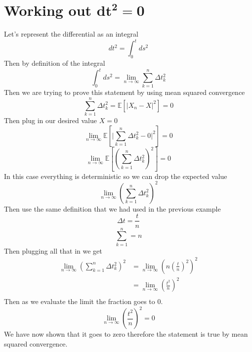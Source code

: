 \documentclass{article}
\begin{document}
\section*{Working out $\boldsymbol{dt^2 = 0}$}
Let's represent the differential as an integral
$$
dt^2 = \int_0^{t} ds^2
$$
Then by definition of the integral
$$
\int_0^t ds^2 = \lim_{n \to \infty} \sum_{k=1}^n \Delta t_k^2
$$
Then we are trying to prove this statement by using mean squared convergence
$$
\sum_{k=1}^n \Delta t_k^2 = \mathbb{E} \left[ \biggr\rvert X_n - X \biggr\rvert^2 \right] = 0
$$
Then plug in our desired value $X = 0$ 
$$
\lim_{n \to \infty} \mathbb{E} \left[ \biggr\rvert \sum_{k=1}^n \Delta t_k^2 - 0 \biggr\rvert^2 \right] = 0
$$
$$
\lim_{n \to \infty} \mathbb{E} \left[ \left(\sum_{k=1}^n \Delta t_k^2 \right)^2 \right] = 0
$$
In this case everything is deterministic so we can drop the expected value
$$
\lim_{n \to \infty} \left( \sum_{k=1}^n \Delta t_k^2 \right)^2
$$
Then use the same definition that we had used in the previous example 
$$
\Delta t = \frac{t}{n}
$$
$$
\sum_{k=1}^n = n
$$
Then plugging all that in we get 
\begin{equation}
\begin{split}
    \lim_{n \to \infty} \left(\sum_{k=1}^n \Delta t_k^2 \right)^2 &= \lim_{n \to \infty} \left( n \left( \frac{t}{n} \right)^2 \right)^2 \\ 
    & = \lim_{n \to \infty} \left( \frac{t^2}{n} \right)^2 \\
\end{split}
\end{equation}
Then as we evaluate the limit the fraction goes to 0. 
$$
\lim_{n \to \infty} \left( \frac{t^2}{n} \right)^2 = 0
$$
We have now shown that it goes to zero therefore the statement is true by mean squared convergence.
\end{document}
